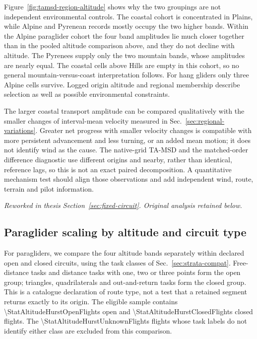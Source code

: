 Figure~\ref{fig:tamsd-region-altitude} shows why the two groupings are not
independent environmental controls. The coastal cohort is concentrated in Plains,
while Alpine and Pyrenean records mostly occupy the two higher bands. Within the
Alpine paraglider cohort the four band amplitudes lie much closer together than in
the pooled altitude comparison above, and they do not decline with altitude. The
Pyrenees supply only the two mountain bands, whose amplitudes are nearly equal.
The coastal cells above Hills are empty in this cohort, so no general
mountain-versus-coast interpretation follows. For hang gliders only three Alpine
cells survive. Logged origin altitude and regional membership describe selection
as well as possible environmental constraints.

The larger coastal transport amplitude can be compared qualitatively with the
smaller changes of interval-mean velocity measured in
Sec.~\ref{sec:regional-variations}. Greater net progress with smaller velocity
changes is compatible with more persistent advancement and less turning, or an
added mean motion; it does not identify wind as the cause. The native-grid
TA-MSD and the matched-order difference diagnostic use different origins and
nearby, rather than identical, reference lags, so this is not an exact paired
decomposition. A quantitative mechanism test should align those observations and
add independent wind, route, terrain and pilot information.

\begingroup\color{red!70!black}
\noindent\textit{Reworked in thesis Section~\ref{sec:fixed-circuit}. Original analysis retained below.}\par
\subsection{Paraglider scaling by altitude and circuit type}
\label{sec:altitude-hurst}

For paragliders, we compare the four altitude bands separately within declared
open and closed circuits, using the task classes of Sec.~\ref{sec:strata-compat}.
Free-distance tasks and distance tasks with one, two or three points form the
open group; triangles, quadrilaterals and out-and-return tasks form the closed
group. This is a catalogue declaration of route type, not a test that a retained
segment returns exactly to its origin. The eligible sample contains
\num{\StatAltitudeHurstOpenFlights} open and
\num{\StatAltitudeHurstClosedFlights} closed flights. The
\num{\StatAltitudeHurstUnknownFlights} flights whose task labels do not identify
either class are excluded from this comparison.


